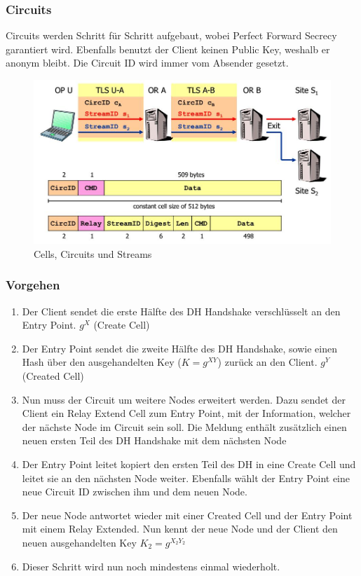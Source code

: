 \subsubsection{Circuits}
Circuits werden Schritt für Schritt aufgebaut, wobei Perfect Forward Secrecy garantiert wird. Ebenfalls benutzt der Client keinen Public Key, weshalb er anonym bleibt. Die Circuit ID wird immer vom Absender gesetzt.
\begin{figure}[h]
\centering
\includegraphics[width=0.7\linewidth]{images/tor_cells_circuits_streams}
\caption{Cells, Circuits und Streams}
\label{fig:torcellscircuitsstreams}
\end{figure}

\subsubsection{Vorgehen}
\begin{enumerate}
	\item Der Client sendet die erste Hälfte des DH Handshake verschlüsselt an den Entry Point. $g^X$ (Create Cell)
	\item Der Entry Point sendet die zweite Hälfte des DH Handshake, sowie einen Hash über den ausgehandelten Key ($K=g^{XY}$) zurück an den Client. $g^Y$(Created Cell)
	\item Nun muss der Circuit um weitere Nodes erweitert werden. Dazu sendet der Client ein Relay Extend Cell zum Entry Point, mit der Information, welcher der nächste Node im Circuit sein soll. Die Meldung enthält zusätzlich einen neuen ersten Teil des DH Handshake mit dem nächsten Node
	\item Der Entry Point leitet kopiert den ersten Teil des DH in eine Create Cell und leitet sie an den nächsten Node weiter. Ebenfalls wählt der Entry Point eine neue Circuit ID zwischen ihm und dem neuen Node.
	\item Der neue Node antwortet wieder mit einer Created Cell und der Entry Point mit einem Relay Extended. Nun kennt der neue Node und der Client den neuen ausgehandelten  Key $K_2 = g^{X_2 Y_2}$
	\item Dieser Schritt wird nun noch mindestens einmal wiederholt.
\end{enumerate}

